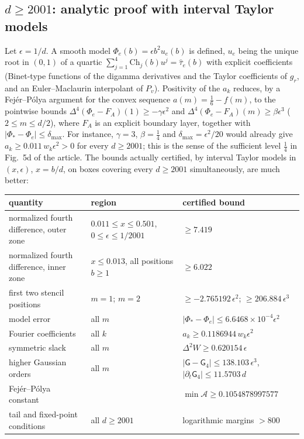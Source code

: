 \documentclass[11pt]{amsart}
\theoremstyle{definition}
\theoremstyle{remark}
\numberwithin{equation}{section}
\begin{document}
\subsection{\texorpdfstring{$d\ge2001$}{d >= 2001}: analytic proof with interval Taylor models}
Let $\epsilon=1/d$. A smooth model $\Phi_e(b)=\epsilon b^2u_e(b)$ is defined, $u_e$ being the unique root in $(0,1)$ of
a quartic $\sum_{j=1}^4\mathrm{Ch}_j(b)u^j=\hat\tau_e(b)$ with explicit coefficients (Binet-type functions of the digamma
derivatives and the Taylor coefficients of $g_r$, and an Euler--Maclaurin interpolant of $P_v$). Positivity of the
$a_k$ reduces, by a Fej\'er--P\'olya argument for the convex sequence $a(m)=\frac16-f(m)$, to the pointwise bounds
$\Delta^4(\Phi_e-F_A)(1)\ge-\gamma\epsilon^2$ and $\Delta^4(\Phi_e-F_A)(m)\ge\beta\epsilon^3$ ($2\le m\le d/2$), where
$F_A$ is an explicit boundary layer, together with $|\Phi_*-\Phi_e|\le\delta_{\max}$. For instance, $\gamma=3$,
$\beta=\frac14$ and $\delta_{\max}=\epsilon^2/20$ would already give $a_k\ge0.011\,w_k\epsilon^2>0$ for every $d\ge2001$;
this is the sense of the sufficient level $\frac14$ in Fig.~5d of the article. The bounds actually certified, by interval
Taylor models in $(x,\epsilon)$, $x=b/d$, on boxes covering every $d\ge2001$ simultaneously, are much better:
\begin{center}
\small
\begin{tabular}{>{\raggedright\arraybackslash}p{4.9cm}>{\raggedright\arraybackslash}p{5.0cm}>{\raggedright\arraybackslash}p{4.3cm}}
\toprule
quantity & region & certified bound\\
\midrule
normalized fourth difference, outer zone & $0.011\le x\le0.501$, $0\le\epsilon\le1/2001$ & $\ge7.419$\\
normalized fourth difference, inner zone & $x\le0.013$, all positions $b\ge1$ & $\ge6.022$\\
first two stencil positions & $m=1$; $m=2$ & $\ge-2.765192\,\epsilon^2$; $\ge206.884\,\epsilon^3$\\
model error & all $m$ & $|\Phi_*-\Phi_e|\le6.6468\times10^{-4}\epsilon^2$\\
Fourier coefficients & all $k$ & $a_k\ge0.1186944\,w_k\epsilon^2$\\
symmetric slack & all $m$ & $\Delta^2W\ge0.620154\,\epsilon$\\
higher Gaussian orders & all $m$ & $|\mathsf G-\mathsf G_4|\le138.103\,\epsilon^3$, $|\partial_t\mathsf G_4|\le11.5703\,d$\\
Fej\'er--P\'olya constant & & $\min\mathcal A\ge0.1054878997577$\\
tail and fixed-point conditions & all $d\ge2001$ & logarithmic margins $>800$\\
\bottomrule
\end{tabular}
\end{center}
\end{document}
